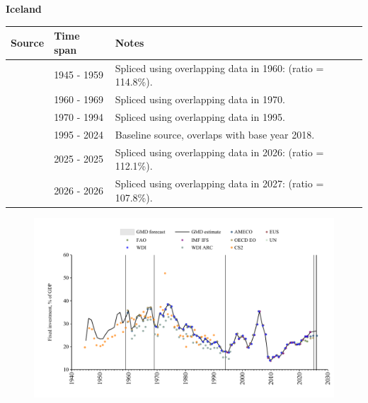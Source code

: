\documentclass[12pt,a4paper,landscape]{article}
\begin{document}
\begin{adjustbox}{max totalsize={\paperwidth}{\paperheight},center}
\begin{minipage}[t][\textheight][t]{\textwidth}
\vspace*{0.5cm}
{}
\begin{center}
{\Large\bfseries Iceland}
\end{center}
\vspace{0.5cm}
\begin{table}[H]
\centering
\small
\begin{tabular}{|l|l|l|}
\hline
\textbf{Source} & \textbf{Time span} & \textbf{Notes} \\
\hline
\rowcolor{white}\cite{CS2_ISL}& 1945 - 1959 &Spliced using overlapping data in 1960: (ratio = 114.8\%).\\
\rowcolor{lightgray}\cite{OECD_EO}& 1960 - 1969 &Spliced using overlapping data in 1970.\\
\rowcolor{white}\cite{WDI}& 1970 - 1994 &Spliced using overlapping data in 1995.\\
\rowcolor{lightgray}\cite{EUS}& 1995 - 2024 &Baseline source, overlaps with base year 2018.\\
\rowcolor{white}\cite{OECD_EO}& 2025 - 2025 &Spliced using overlapping data in 2026: (ratio = 112.1\%).\\
\rowcolor{lightgray}\cite{AMECO}& 2026 - 2026 &Spliced using overlapping data in 2027: (ratio = 107.8\%).\\
\hline
\end{tabular}
\end{table}
\begin{figure}[H]
\centering
\includegraphics[width=\textwidth,height=0.6\textheight,keepaspectratio]{graphs/ISL_finv_GDP.pdf}
\end{figure}
\end{minipage}
\end{adjustbox}
\end{document}
